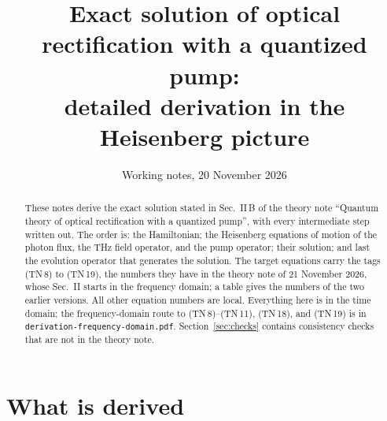 \documentclass[aps,pra,onecolumn,notitlepage,11pt,amsmath,amssymb,nofootinbib]{revtex4-2}
\begin{document}
\title{Exact solution of optical rectification with a quantized pump:\\
detailed derivation in the Heisenberg picture}
\author{Working notes, 20 November 2026}
\noaffiliation

\begin{abstract}
These notes derive the exact solution stated in Sec.~II\,B of the theory note
``Quantum theory of optical rectification with a quantized pump'', with every
intermediate step written out. The order is: the Hamiltonian; the Heisenberg
equations of motion of the photon flux, the THz field operator, and the pump
operator; their solution; and last the evolution operator that generates the
solution. The target equations carry the tags (TN\,8) to (TN\,19), the
numbers they have in the theory note of 21 November 2026, whose Sec.~II
starts in the frequency domain; a table gives the numbers of the two earlier
versions. All other equation numbers are local. Everything here is in the
time domain; the frequency-domain route to (TN\,8)--(TN\,11), (TN\,18), and
(TN\,19) is in \texttt{derivation-frequency-domain.pdf}. Section~\ref{sec:checks} contains consistency checks that are not
in the theory note.
\end{abstract}

\maketitle

\section{What is derived}
\end{document}
